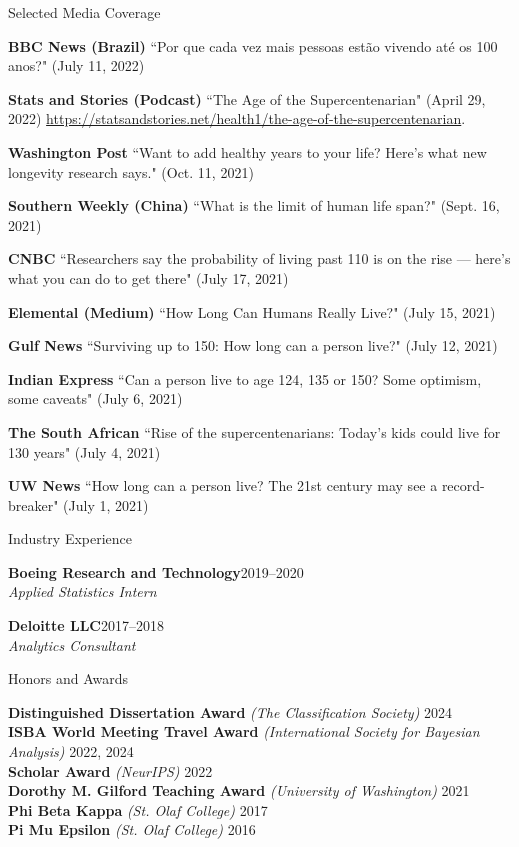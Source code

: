 \documentclass{resume} %
\begin{document}
\begin{rSection}{Selected Media Coverage}

\textbf{BBC News (Brazil)} ``Por que cada vez mais pessoas est\~{a}o vivendo at\'{e} os 100 anos?" (July 11, 2022)

\textbf{Stats and Stories (Podcast)} ``The Age of the Supercentenarian" (April 29, 2022) \url{https://statsandstories.net/health1/the-age-of-the-supercentenarian}.

\textbf{Washington Post} ``Want to add healthy years to your life? Here’s what new longevity research says." (Oct. 11, 2021)

\textbf{Southern Weekly (China)} ``What is the limit of human life span?" (Sept. 16, 2021)

\textbf{CNBC} ``Researchers say the probability of living past 110 is on the rise — here’s what you can do to get there" (July 17, 2021)

\textbf{Elemental (Medium)} ``How Long Can Humans Really Live?" (July 15, 2021)

\textbf{Gulf News} ``Surviving up to 150: How long can a person live?" (July 12, 2021)

\textbf{Indian Express} ``Can a person live to age 124, 135 or 150? Some optimism, some caveats" (July 6, 2021)

\textbf{The South African} ``Rise of the supercentenarians: Today’s kids could live for 130 years" (July 4, 2021)

\textbf{UW News} ``How long can a person live? The 21st century may see a record-breaker" (July 1, 2021)

\end{rSection}

\begin{rSection}{Industry Experience}

\textbf{Boeing Research and Technology}\hfill{2019--2020}
\\{\it Applied Statistics Intern}

\textbf{Deloitte LLC}\hfill{2017--2018}
\\{\it Analytics Consultant}

\end{rSection}

\begin{rSection}{Honors and Awards}

\textbf{Distinguished Dissertation Award} {\it (The Classification Society)} \hfill {2024}
\\ \textbf{ISBA World Meeting Travel Award} {\it (International Society for Bayesian Analysis)} \hfill {2022, 2024}
\\ \textbf{Scholar Award} {\it (NeurIPS)} \hfill {2022}
\\ \textbf{Dorothy M. Gilford Teaching Award} {\it (University of Washington)} \hfill {2021}
\\ \textbf{Phi Beta Kappa} {\it (St. Olaf College)} \hfill{2017}
\\ \textbf{Pi Mu Epsilon} {\it (St. Olaf College)} \hfill{2016}

\end{rSection}
\end{document}
